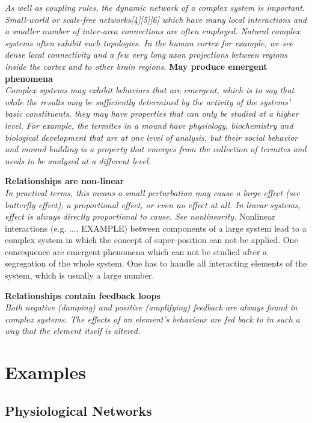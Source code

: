\documentclass[a4paper,10pt]{scrbook}
\begin{document}
\textit{As well as coupling rules, the dynamic network of a complex system is important. Small-world or scale-free networks[4][5][6] which have many local interactions and a smaller number of inter-area connections are often employed. Natural complex systems often exhibit such topologies. In the human cortex for example, we see dense local connectivity and a few very long axon projections between regions inside the cortex and to other brain regions.
}
\textbf{May produce emergent phenomena}\\

\textit{Complex systems may exhibit behaviors that are emergent, which is to say that while the results may be sufficiently determined by the activity of the systems' basic constituents, they may have properties that can only be studied at a higher level. For example, the termites in a mound have physiology, biochemistry and biological development that are at one level of analysis, but their social behavior and mound building is a property that emerges from the collection of termites and needs to be analysed at a different level.
}

\textbf{Relationships are non-linear}\\

\textit{In practical terms, this means a small perturbation may cause a large effect (see butterfly effect), a proportional effect, or even no effect at all. In linear systems, effect is always directly proportional to cause. See nonlinearity.
}
Nonlinear interactions (e.g. .... EXAMPLE) between components of a large
system lead to a complex system in which the concept of super-position can not
be applied. One concequence are emergent phenomena which can not be
studied after a segregation of the whole system. One has to handle all
interacting elements of the system, which is usually a large number.

\textbf{Relationships contain feedback loops}\\

\textit{Both negative (damping) and positive (amplifying) feedback are always found in complex systems. The effects of an element's behaviour are fed back to in such a way that the element itself is altered.
}

\section{Examples} 

\subsection{Physiological Networks}
\end{document}
